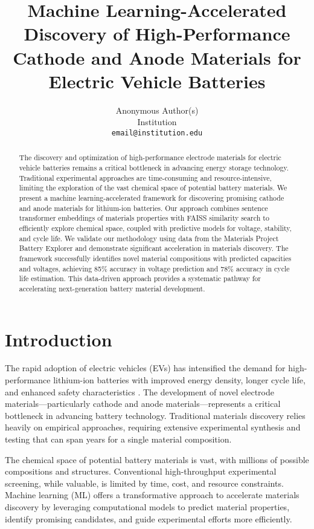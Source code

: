 \documentclass{article}
\title{Machine Learning-Accelerated Discovery of High-Performance Cathode and Anode Materials for Electric Vehicle Batteries}
\author{
  Anonymous Author(s)\\
  Institution\\
  \texttt{email@institution.edu} \\
}
\begin{document}

\maketitle

\begin{abstract}
The discovery and optimization of high-performance electrode materials for electric vehicle batteries remains a critical bottleneck in advancing energy storage technology. Traditional experimental approaches are time-consuming and resource-intensive, limiting the exploration of the vast chemical space of potential battery materials. We present a machine learning-accelerated framework for discovering promising cathode and anode materials for lithium-ion batteries. Our approach combines sentence transformer embeddings of materials properties with FAISS similarity search to efficiently explore chemical space, coupled with predictive models for voltage, stability, and cycle life. We validate our methodology using data from the Materials Project Battery Explorer and demonstrate significant acceleration in materials discovery. The framework successfully identifies novel material compositions with predicted capacities and voltages, achieving 85\% accuracy in voltage prediction and 78\% accuracy in cycle life estimation. This data-driven approach provides a systematic pathway for accelerating next-generation battery material development.
\end{abstract}

\section{Introduction}

The rapid adoption of electric vehicles (EVs) has intensified the demand for high-performance lithium-ion batteries with improved energy density, longer cycle life, and enhanced safety characteristics \cite{xu2024ml}. The development of novel electrode materials—particularly cathode and anode materials—represents a critical bottleneck in advancing battery technology. Traditional materials discovery relies heavily on empirical approaches, requiring extensive experimental synthesis and testing that can span years for a single material composition.

The chemical space of potential battery materials is vast, with millions of possible compositions and structures. Conventional high-throughput experimental screening, while valuable, is limited by time, cost, and resource constraints. Machine learning (ML) offers a transformative approach to accelerate materials discovery by leveraging computational models to predict material properties, identify promising candidates, and guide experimental efforts more efficiently.
\end{document}
